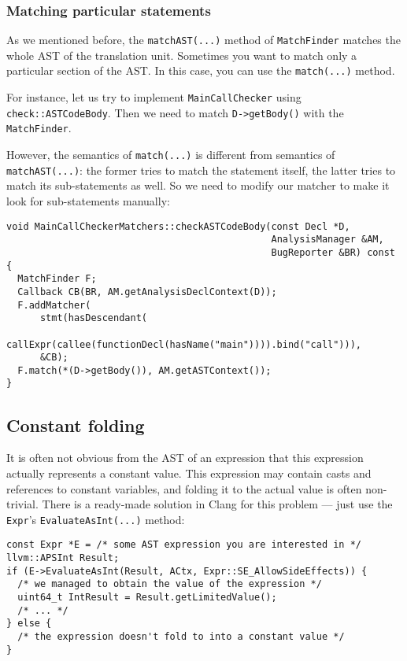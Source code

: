 \documentclass[a4paper,12pt]{article}
\newenvironment{nobr}{\begin{minipage}{\textwidth}\setlength\parskip{1em}
}{\end{minipage}\ignorespacesafterend}
\begin{document}
\subsubsection{Matching particular statements}

As we mentioned before, the \lstinline|matchAST(...)| method of \lstinline|MatchFinder| matches the whole AST of the translation unit. Sometimes you want to match only a particular section of the AST. In this case, you can use the \lstinline|match(...)| method.

For instance, let us try to implement \lstinline|MainCallChecker| using \lstinline|check::ASTCodeBody|. Then we need to match \lstinline|D->getBody()| with the \lstinline|MatchFinder|.

\begin{nobr}
However, the semantics of \lstinline|match(...)| is different from semantics of \lstinline|matchAST(...)|: the former tries to match the statement itself, the latter tries to match its sub-statements as well. So we need to modify our matcher to make it look for sub-statements manually:

\begin{lstlisting}[style=cplusplus]
void MainCallCheckerMatchers::checkASTCodeBody(const Decl *D,
                                               AnalysisManager &AM,
                                               BugReporter &BR) const {
  MatchFinder F;
  Callback CB(BR, AM.getAnalysisDeclContext(D));
  F.addMatcher(
      stmt(hasDescendant(
          callExpr(callee(functionDecl(hasName("main")))).bind("call"))),
      &CB);
  F.match(*(D->getBody()), AM.getASTContext());
}
\end{lstlisting}
\end{nobr}

\begin{nobr}
\subsection{Constant folding}

It is often not obvious from the AST of an expression that this expression actually represents a constant value. This expression may contain casts and references to constant variables, and folding it to the actual value is often non-trivial. There is a ready-made solution in Clang for this problem --- just use the \lstinline|Expr|'s \lstinline|EvaluateAsInt(...)| method:
\begin{lstlisting}[style=cplusplus,numbers=none]
const Expr *E = /* some AST expression you are interested in */
llvm::APSInt Result;
if (E->EvaluateAsInt(Result, ACtx, Expr::SE_AllowSideEffects)) {
  /* we managed to obtain the value of the expression */
  uint64_t IntResult = Result.getLimitedValue();
  /* ... */
} else {
  /* the expression doesn't fold to into a constant value */
}

\end{lstlisting}
\end{nobr}
\end{document}
